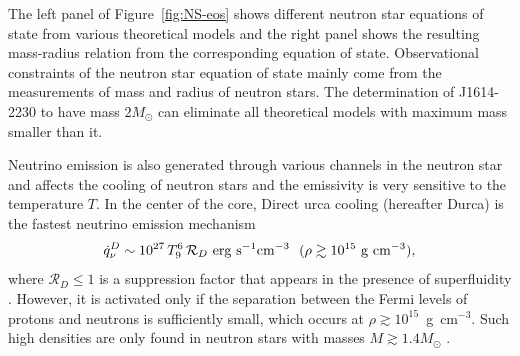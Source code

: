 The left panel of Figure~\ref{fig:NS-eos} shows different neutron star equations of state from various theoretical models and the right panel shows the resulting mass-radius relation from the corresponding equation of state.
Observational constraints of the neutron star equation of state mainly come from the measurements of mass and radius of neutron stars.
The determination of J1614-2230 to have mass $2M_\odot$ \citep{2010Natur.467.1081D} can eliminate all theoretical models with maximum mass smaller than it.

Neutrino emission is also generated through various channels in the neutron star and affects the cooling of neutron stars and the emissivity is very sensitive to the temperature $T$.
In the center of the core, Direct urca cooling (hereafter Durca) is the fastest neutrino emission mechanism
%
\begin{equation}
	   \dot{q}_\nu^D\sim 10^{27}\,T_9^6\, \mathcal{R}_D {\rm~erg~s}^{-1}{\rm cm}^{-3} \:\:\: (\rho\gtrsim 10^{15} {\rm~g~cm}^{-3}),
\end{equation}
%
where $\mathcal{R}_D\leq 1$ is a suppression factor that appears in the presence of 
superfluidity \citep{2001PhR...354....1Y}.  
However, it is activated only if the separation between the Fermi levels of protons and neutrons is sufficiently small, which occurs
at $\rho\gtrsim 10^{15}$~g~cm$^{-3}$.
Such high densities are only found in neutron stars with masses  $M \gtrsim 1.4 M_\odot$ \citep{1991PhRvL..66.2701L}.

